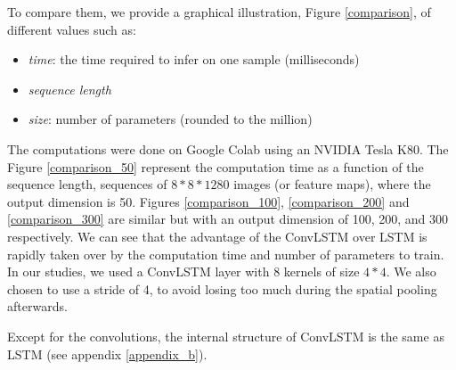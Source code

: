 \documentclass[12pt, a4paper]{report}
\begin{document}
					\par
					To compare them, we provide a graphical illustration, Figure \ref{comparison}, of different values such as:
					\begin{itemize}
						\item {\itshape time}: the time required to infer on one sample (milliseconds)
						\item {\itshape sequence length}
						\item {\itshape size}: number of parameters (rounded to the million)
					\end{itemize}
					The computations were done on Google Colab using an NVIDIA Tesla K80.
					The Figure \ref{comparison_50} represent the computation time as a function of the sequence length, sequences of $8*8*1280$ images (or feature maps), where the output dimension is 50.
					Figures \ref{comparison_100}, \ref{comparison_200} and \ref{comparison_300} are similar but with an output dimension of 100, 200, and 300 respectively.
					We can see that the advantage of the ConvLSTM over LSTM is rapidly taken over by the computation time and number of parameters to train.
					In our studies, we used a ConvLSTM layer with 8 kernels of size $4*4$.
					We also chosen to use a stride of 4, to avoid losing too much during the spatial pooling afterwards.
					\par
					Except for the convolutions, the internal structure of ConvLSTM is the same as LSTM (see appendix \ref{appendix_b}).
\end{document}
